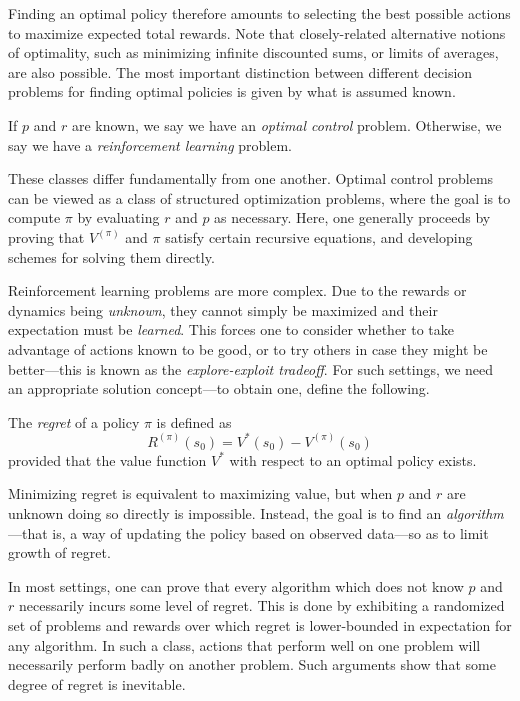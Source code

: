 \documentclass[11pt]{book}
\begin{document}
Finding an optimal policy therefore amounts to selecting the best possible actions to maximize expected total rewards.
Note that closely-related alternative notions of optimality, such as minimizing infinite discounted sums, or limits of averages, are also possible.
The most important distinction between different decision problems for finding optimal policies is given by what is assumed known.

\1 If $p$ and $r$ are known, we say we have an \emph{optimal control} problem.
\2 Otherwise, we say we have a \emph{reinforcement learning} problem.
\0 

These classes differ fundamentally from one another. 
Optimal control problems can be viewed as a class of structured optimization problems, where the goal is to compute $\pi$ by evaluating $r$ and $p$ as necessary.
Here, one generally proceeds by proving that $V^{(\pi)}$ and $\pi$ satisfy certain recursive equations, and developing schemes for solving them directly.

Reinforcement learning problems are more complex.
Due to the rewards or dynamics being \emph{unknown}, they cannot simply be maximized and their expectation must be \emph{learned}.
This forces one to consider whether to take advantage of actions known to be good, or to try others in case they might be better---this is known as the \emph{explore-exploit tradeoff}.
For such settings, we need an appropriate solution concept---to obtain one, define the following.

\label{ntn:mdp-regret}
\begin{definition}[Regret]
The \emph{regret} of a policy $\pi$ is defined as 
\[
R^{(\pi)}(s_0) = V^*(s_0) - V^{(\pi)}(s_0)
\]
provided that the value function $V^*$ with respect to an optimal policy exists.
\end{definition}

Minimizing regret is equivalent to maximizing value, but when $p$ and $r$ are unknown doing so directly is impossible.
Instead, the goal is to find an \emph{algorithm}---that is, a way of updating the policy based on observed data---so as to limit growth of regret.

In most settings, one can prove that every algorithm which does not know $p$ and $r$ necessarily incurs some level of regret.
This is done by exhibiting a randomized set of problems and rewards over which regret is lower-bounded in expectation for any algorithm.
In such a class, actions that perform well on one problem will necessarily perform badly on another problem.
Such arguments show that some degree of regret is inevitable.
\end{document}
